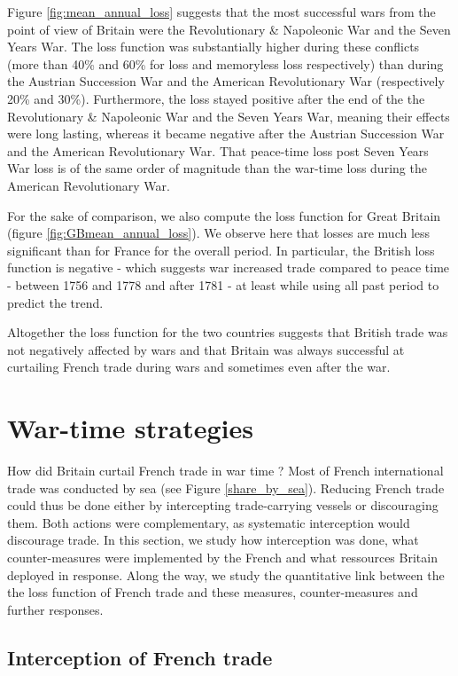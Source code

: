 \documentclass[12pt,a4paper,notitlepage,english]{article}
\begin{document}
Figure \ref{fig:mean_annual_loss} suggests that the most successful wars from the point of view of Britain were the Revolutionary \& Napoleonic War and the Seven Years War.
The loss function was substantially higher during these conflicts (more than 40\% and 60\% for loss and memoryless loss respectively) than during the Austrian Succession War and the American Revolutionary War (respectively 20\% and 30\%).
Furthermore, the loss stayed positive after the end of the the Revolutionary \& Napoleonic War and the Seven Years War, meaning their effects were long lasting, whereas it became negative after the Austrian Succession War and the American Revolutionary War.
That peace-time loss post Seven Years War loss is of the same order of magnitude than the war-time loss during the American Revolutionary War.

For the sake of comparison, we also compute the loss function for Great Britain (figure \ref{fig:GBmean_annual_loss}).
We observe here that losses are much less significant than for France for the overall period. In particular, the British loss function is negative - which suggests war increased trade compared to peace time - between 1756 and 1778 and after 1781 - at least while using all past period to predict the trend.

Altogether the loss function for the two countries suggests that British trade was not negatively affected by wars and that Britain was always successful at curtailing French trade during wars and sometimes even after the war.  

\section{War-time strategies}
\label{sec:wartime_strategies}

How did Britain curtail French trade in war time ?
Most of French international trade was conducted by sea (see Figure \ref{share_by_sea}).
Reducing French trade could thus be done either by intercepting trade-carrying vessels or discouraging them.
Both actions were complementary, as systematic interception would discourage trade. 
In this section, we study how interception was done, what counter-measures were implemented by the French and what ressources Britain deployed in response.
Along the way, we study the quantitative link between the the loss function of French trade and these measures, counter-measures and further responses.

\subsection{Interception of French trade}
\end{document}
